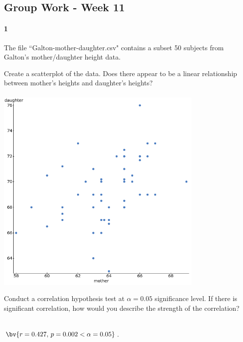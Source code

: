 \documentclass{article}
\begin{document}
\begin{flushleft}
\section*{Group Work - Week 11}
\paragraph{1} The file ``Galton-mother-daughter.csv" contains a subset 50 subjects from Galton's mother/daughter height data.
\begin{enumalpha}
\item Create a scatterplot of the data. Does there appear to be a linear relationship between mother's heights and daughter's heights?\\
\medskip
{}\\
\medskip
\includegraphics[width=4in]{images/grp11_Q1_a}
\vspace{.25in}

\item Conduct a correlation hypothesis test at $\alpha = 0.05$ significance level. If there is significant correlation, how would you describe the strength of the correlation?\\
\medskip
{}\\
\medskip

$\bv{r = 0.427, \, p = 0.002 < \alpha = 0.05}$. 


\end{enumalpha}
\end{flushleft}
\end{document}
